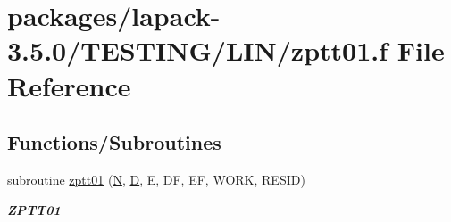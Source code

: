 \hypertarget{zptt01_8f}{}\section{packages/lapack-\/3.5.0/\+T\+E\+S\+T\+I\+N\+G/\+L\+I\+N/zptt01.f File Reference}
\label{zptt01_8f}
\subsection*{Functions/\+Subroutines}
\begin{DoxyCompactItemize}
\item 
subroutine \hyperlink{group__complex16__lin_ga66b4060d0db57474ba432cdcebbb8f27}{zptt01} (\hyperlink{polmisc_8c_a0240ac851181b84ac374872dc5434ee4}{N}, \hyperlink{odrpack_8h_a7dae6ea403d00f3687f24a874e67d139}{D}, E, D\+F, E\+F, W\+O\+R\+K, R\+E\+S\+I\+D)
\begin{DoxyCompactList}\small\item\em {\bfseries Z\+P\+T\+T01} \end{DoxyCompactList}\end{DoxyCompactItemize}

